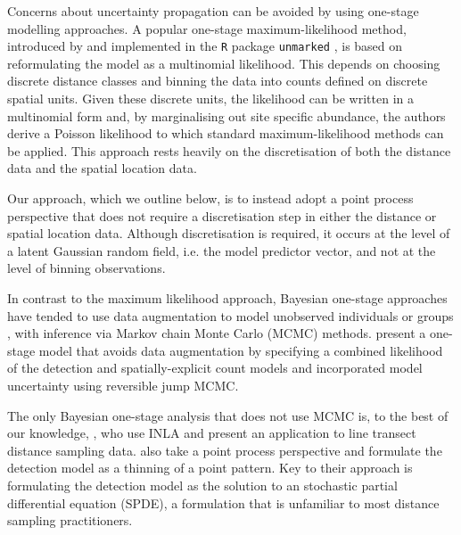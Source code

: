 \documentclass{statsoc}
\begin{document}
Concerns about uncertainty propagation can be avoided by using one-stage modelling approaches.  A popular one-stage maximum-likelihood method, introduced by \cite{royle_ModelingAbundanceEffects_2004} and implemented in the \texttt{R} package \texttt{unmarked} \citep{fiske_UnmarkedPackageFitting_2011}, is based on reformulating the model as a multinomial likelihood.  This depends on choosing discrete distance classes and binning the data into counts defined on discrete spatial units.  Given these discrete units, the likelihood can be written in a multinomial form and, by marginalising out site specific abundance, the authors derive a Poisson likelihood to which standard maximum-likelihood methods can be applied. This approach rests heavily on the discretisation of both the distance data and the spatial location data. 

Our approach, which we outline below, is to instead adopt a point process perspective that does not require a discretisation step in either the distance or spatial location data. Although discretisation is required, it occurs at the level of a latent Gaussian random field, i.e. the model predictor vector, and not at the level of binning observations. 

In contrast to the maximum likelihood approach, Bayesian one-stage approaches have tended to use data augmentation to model unobserved individuals or groups \citep{schmidt_using_2012}, with inference via Markov chain Monte Carlo (MCMC) methods.  \citet{oedekoven_bayesian_2014} present a one-stage model that avoids data augmentation by specifying a combined likelihood of the detection and spatially-explicit count models and incorporated model uncertainty using reversible jump MCMC.

The only Bayesian one-stage analysis that does not use MCMC is, to the best of our knowledge, \citet{yuan_point_2017}, who use INLA and present an application to line transect distance sampling data.  \citet{yuan_point_2017} also take a point process perspective and formulate the detection model as a thinning of a point pattern.  Key to their approach is formulating the detection model as the solution to an stochastic partial differential equation (SPDE), a formulation that is unfamiliar to most distance sampling practitioners.
\end{document}
